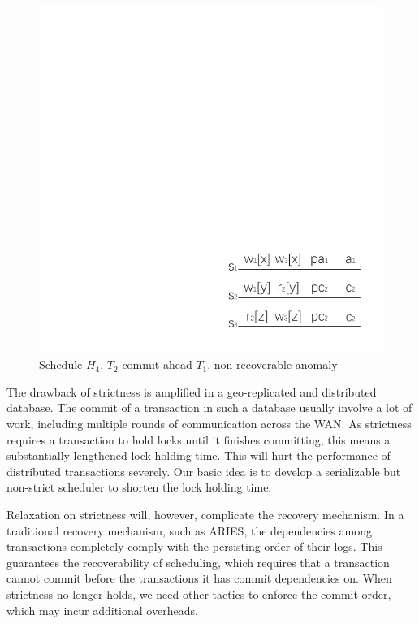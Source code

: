\documentclass[conference]{IEEEtran}
\begin{document}
\begin{figure}[htbp]
  \centerline{\includegraphics[scale=1]{figure/schedule_not_recoverable.pdf}}
  \caption{Schedule ${H_4}$, ${T_2}$ commit ahead ${T_1}$, non-recoverable anomaly}
  \label{fig:schedule_not_recoverable}
\end{figure}



The drawback of strictness is amplified in a geo-replicated and distributed database.
The commit of a transaction in such a database usually involve a lot of work, including multiple rounds of communication across the WAN.
As strictness requires a transaction to hold locks until it finishes committing, this means a substantially lengthened lock holding time. 
This will hurt the performance of distributed transactions severely.
Our basic idea is to develop a serializable but non-strict scheduler to shorten the lock holding time.

Relaxation on strictness will, however, complicate the recovery mechanism.
In a traditional recovery mechanism, such as ARIES, the dependencies among transactions completely comply with the persisting order of their logs. %
This guarantees the recoverability of scheduling, which requires that a transaction cannot commit before the transactions it has commit dependencies on.
When strictness no longer holds, we need other tactics to enforce the commit order, which may incur additional overheads.
\end{document}
